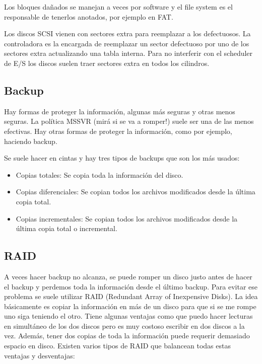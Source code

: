\documentclass{article}
\begin{document}
Los bloques da\~nados se manejan a veces por software y el file system es el responsable de tenerlos anotados, por ejemplo en FAT.

Los discos SCSI vienen con sectores extra para reemplazar a los defectuosos. La controladora es la encargada de reemplazar un sector defectuoso por uno de los sectores extra actualizando una tabla interna. Para no interferir con el scheduler de E/S los discos suelen traer sectores extra en todos los cilindros.

\subsection{Backup}

Hay formas de proteger la informaci\'on, algunas m\'as seguras y otras menos seguras. La pol\'itica MSSVR (mir\'a si se va a romper!) suele ser una de las menos efectivas. Hay otras formas de proteger la informaci\'on, como por ejemplo, haciendo backup.

Se suele hacer en cintas y hay tres tipos de backups que son los m\'as usados:

\begin{itemize}
\item Copias totales: Se copia toda la informaci\'on del disco.
\item Copias diferenciales: Se copian todos los archivos modificados desde la \'ultima copia total.		
\item Copias incrementales: Se copian todos los archivos modificados desde la \'ultima copia total o incremental.
\end{itemize}

\subsection{RAID}

A veces hacer backup no alcanza, se puede romper un disco justo antes de hacer el backup y perdemos toda la informaci\'on desde el \'ultimo backup. Para evitar ese problema se suele utilizar RAID (Redundant Array of Inexpensive Disks). La idea b\'asicamente es copiar la informaci\'on en m\'as de un disco para que si se me rompe uno siga teniendo el otro. Tiene algunas ventajas como que puedo hacer lecturas en simult\'aneo de los dos discos pero es muy costoso escribir en dos discos a la vez. Adem\'as, tener dos copias de toda la informaci\'on puede requerir demasiado espacio en disco. Existen varios tipos de RAID que balancean todas estas ventajas y desventajas:
\end{document}
